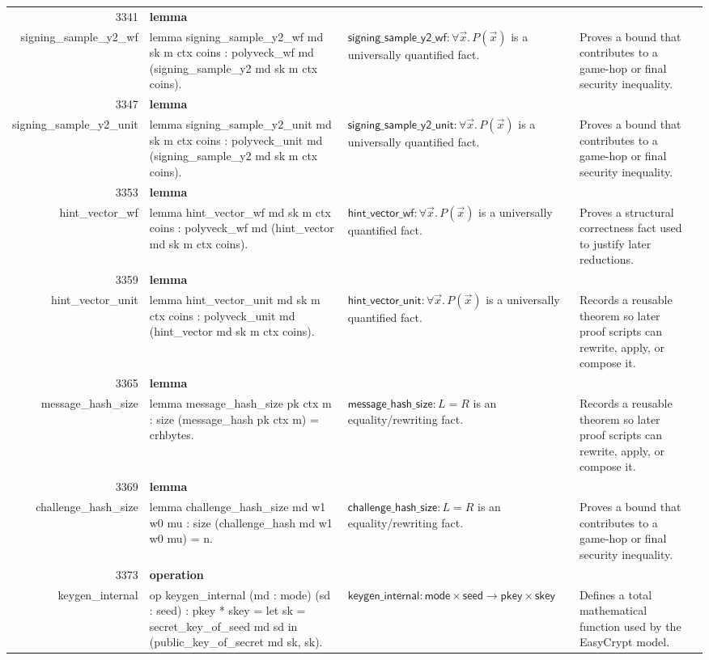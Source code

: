 \documentclass[10pt]{article}
\newcommand{\ec}[1]{\begingroup\ttfamily\scriptsize #1\endgroup}
\begin{document}
\begin{longtable}{r L{0.17\textwidth} L{0.26\textwidth} L{0.27\textwidth} L{0.20\textwidth}}
3341 & \textbf{lemma}\\\ec{signing\_sample\_y2\_wf} & \ec{lemma signing\_sample\_y2\_wf md sk m ctx coins : polyveck\_wf md (signing\_sample\_y2 md sk m ctx coins).} & \(\mathsf{signing\_sample\_y2\_wf} : \forall \vec{x}.\, P(\vec{x})\) is a universally quantified fact. & Proves a bound that contributes to a game-hop or final security inequality. \\
3347 & \textbf{lemma}\\\ec{signing\_sample\_y2\_unit} & \ec{lemma signing\_sample\_y2\_unit md sk m ctx coins : polyveck\_unit md (signing\_sample\_y2 md sk m ctx coins).} & \(\mathsf{signing\_sample\_y2\_unit} : \forall \vec{x}.\, P(\vec{x})\) is a universally quantified fact. & Proves a bound that contributes to a game-hop or final security inequality. \\
3353 & \textbf{lemma}\\\ec{hint\_vector\_wf} & \ec{lemma hint\_vector\_wf md sk m ctx coins : polyveck\_wf md (hint\_vector md sk m ctx coins).} & \(\mathsf{hint\_vector\_wf} : \forall \vec{x}.\, P(\vec{x})\) is a universally quantified fact. & Proves a structural correctness fact used to justify later reductions. \\
3359 & \textbf{lemma}\\\ec{hint\_vector\_unit} & \ec{lemma hint\_vector\_unit md sk m ctx coins : polyveck\_unit md (hint\_vector md sk m ctx coins).} & \(\mathsf{hint\_vector\_unit} : \forall \vec{x}.\, P(\vec{x})\) is a universally quantified fact. & Records a reusable theorem so later proof scripts can rewrite, apply, or compose it. \\
3365 & \textbf{lemma}\\\ec{message\_hash\_size} & \ec{lemma message\_hash\_size pk ctx m : size (message\_hash pk ctx m) = crhbytes.} & \(\mathsf{message\_hash\_size} : L = R\) is an equality/rewriting fact. & Records a reusable theorem so later proof scripts can rewrite, apply, or compose it. \\
3369 & \textbf{lemma}\\\ec{challenge\_hash\_size} & \ec{lemma challenge\_hash\_size md w1 w0 mu : size (challenge\_hash md w1 w0 mu) = n.} & \(\mathsf{challenge\_hash\_size} : L = R\) is an equality/rewriting fact. & Proves a bound that contributes to a game-hop or final security inequality. \\
3373 & \textbf{operation}\\\ec{keygen\_internal} & \ec{op keygen\_internal (md : mode) (sd : seed) : pkey * skey = let sk = secret\_key\_of\_seed md sd in (public\_key\_of\_secret md sk, sk).} & \(\mathsf{keygen\_internal} : \mathsf{mode} \times \mathsf{seed} \to \mathsf{pkey} \times \mathsf{skey}\) & Defines a total mathematical function used by the EasyCrypt model. \\

\end{longtable}
\end{document}
